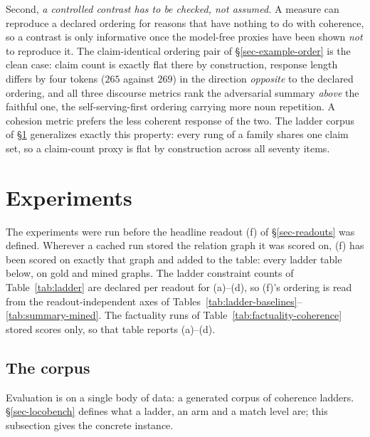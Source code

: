 Second, \emph{a controlled contrast has to be checked, not assumed.} A measure can reproduce a
declared ordering for reasons that have nothing to do with coherence, so a contrast is only
informative once the model-free proxies have been shown \emph{not} to reproduce it. The
claim-identical ordering pair of \S\ref{sec-example-order} is the clean case: claim count is exactly
flat there by construction, response length differs by four tokens ($265$ against $269$) in the
direction \emph{opposite} to the declared ordering, and all three discourse metrics rank the
adversarial summary \emph{above} the faithful one, the self-serving-first ordering carrying more noun
repetition. A cohesion metric prefers the less coherent response of the two. The ladder corpus of
\S\ref{sec-experiments} generalizes exactly this property: every rung of a family shares one claim
set, so a claim-count proxy is flat by construction across all seventy items.

\section{Experiments}
\label{sec-experiments}

The experiments were run before the headline readout (f) of \S\ref{sec-readouts} was defined.
Wherever a cached run stored the relation graph it was scored on, (f) has been scored on exactly
that graph and added to the table: every ladder table below, on gold and mined graphs. The ladder
constraint counts of Table~\ref{tab:ladder} are declared per readout for (a)--(d), so (f)'s ordering
is read from the readout-independent axes of Tables~\ref{tab:ladder-baselines}--\ref{tab:summary-mined}.
The factuality runs of Table~\ref{tab:factuality-coherence} stored scores only, so that table reports
(a)--(d).

\subsection{The corpus}

Evaluation is on a single body of data: a generated corpus of coherence ladders.
\S\ref{sec-locobench} defines what a ladder, an arm and a match level are; this subsection gives the
concrete instance.

